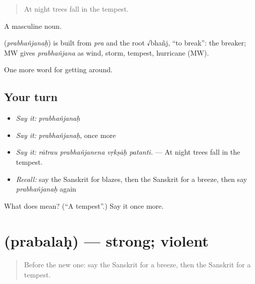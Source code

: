 \begin{quote}
At night trees fall in the tempest.
\end{quote}

A masculine noun.

\begin{cousinweb}
\textbf{} (\emph{prabhañjanaḥ}) is built from \emph{pra} and the root √bhañj, \textquotedblleft{}to break\textquotedblright{}: the breaker; MW gives \emph{prabhañjana} as wind, storm, tempest, hurricane (MW).
\end{cousinweb}

\begin{grammarlens}[title={What you've built}]
One more word for getting around.
\end{grammarlens}

\subsection*{Your turn}
\begin{itemize}
\raggedright
  \item \emph{Say it:} \emph{prabhañjanaḥ}
  \item \emph{Say it:} \emph{prabhañjanaḥ}, once more
  \item \emph{Say it:} \emph{rātrau prabhañjanena vṛkṣāḥ patanti.} — At night trees fall in the tempest.
  \item \emph{Recall:} say the Sanskrit for blazes, then the Sanskrit for a breeze, then say \emph{prabhañjanaḥ} again
\end{itemize}

\begin{tcolorbox}[breakable,colback=teal!4,colframe=teal!35!black,title={Before you move on}]
What does  mean? (\textquotedblleft{}A tempest\textquotedblright{}.) Say it once more.
\end{tcolorbox}
\section[\texorpdfstring{\sk{प्रबलः} (prabalaḥ)}{प्रबलः (prabalaḥ)}]{ (prabalaḥ) — strong; violent}

\label{lesson:SA-C439-prabalah}



\begin{quote}
Before the new one: say the Sanskrit for a breeze, then the Sanskrit for a tempest.
\end{quote}

